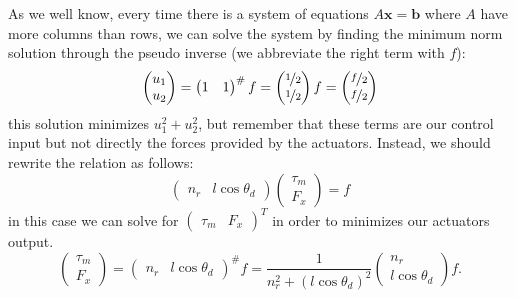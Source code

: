 \documentclass[10pt, a4paper]{report}
\begin{document}
As we well know, every time there is a system of equations $A\mathbf x=\mathbf b$ where $A$ have more columns than rows, we can solve the system by finding the minimum norm solution through the pseudo inverse (we abbreviate the right term with $f$):\begin{equation}
    \begin{pmatrix}
        u_1\\u_2
    \end{pmatrix}=\begin{pmatrix}
        1&1
    \end{pmatrix}^\#f=\begin{pmatrix}
        \nicefrac{1}{2}\\\nicefrac{1}{2}
    \end{pmatrix}f=\begin{pmatrix}
        \nicefrac{f}{2}\\\nicefrac{f}{2}
    \end{pmatrix}
\end{equation}
this solution minimizes $u_1^2+u_2^2$, but remember that these terms are our control input but not directly the forces provided by the actuators. Instead, we should rewrite the relation as follows:
    \begin{equation}
    \begin{pmatrix}
        n_r&l\cos\theta_d
    \end{pmatrix}
      \begin{pmatrix}
        \tau_m\\F_x
    \end{pmatrix}=f
\end{equation}
in this case we can solve for $ \begin{pmatrix}
        \tau_m&F_x
    \end{pmatrix}^T$ in order to minimizes our actuators output.\begin{equation}
        \begin{pmatrix}
        \tau_m\\F_x
    \end{pmatrix}= \begin{pmatrix}
        n_r&l\cos\theta_d
    \end{pmatrix}^\#f=\frac{1}{n_r^2+(l\cos\theta_d)^2}\begin{pmatrix}
        n_r\\l\cos\theta_d
    \end{pmatrix}f.
    \end{equation}
\end{document}
